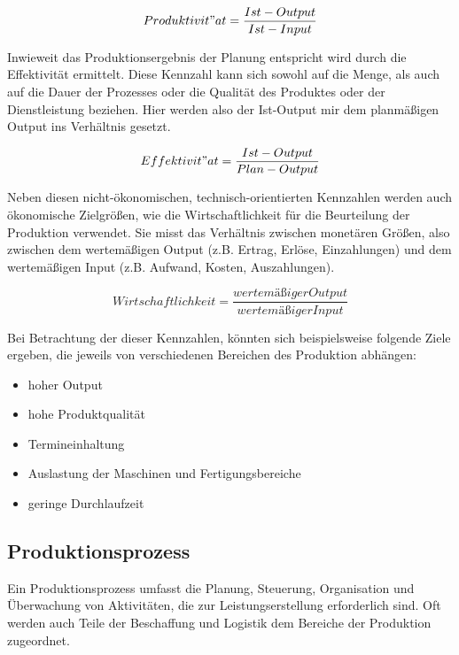 \documentclass[a4paper,12pt, german]{report}
\begin{document}
\begin{equation}
  Produktivit"at =\frac{Ist-Output}{Ist-Input}
\end{equation}

Inwieweit das Produktionsergebnis der Planung entspricht wird durch die Effektivität ermittelt. Diese Kennzahl kann sich sowohl auf die Menge, als auch auf die Dauer der Prozesses oder die Qualität des Produktes oder der Dienstleistung beziehen. Hier werden also der Ist-Output mir dem planmäßigen Output ins Verhältnis gesetzt.\cite{20}

\begin{equation}
  Effektivit"at =\frac{Ist-Output}{Plan-Output}
\end{equation}


Neben diesen nicht-ökonomischen, technisch-orientierten Kennzahlen werden auch ökonomische Zielgrößen, wie die Wirtschaftlichkeit für die Beurteilung der Produktion verwendet. Sie misst das Verhältnis zwischen monetären Größen, also zwischen dem wertemäßigen Output (z.B. Ertrag, Erlöse, Einzahlungen) und dem wertemäßigen Input (z.B. Aufwand, Kosten, Auszahlungen).\cite{7}

\begin{equation}
  Wirtschaftlichkeit =\frac{wertemäßiger Output}{wertemäßiger Input}
\end{equation}

Bei Betrachtung der dieser Kennzahlen, könnten sich beispielsweise folgende Ziele ergeben, die jeweils von verschiedenen Bereichen des Produktion abhängen: 

\begin{itemize}
  \item hoher Output
  \item hohe Produktqualität
  \item Termineinhaltung
  \item Auslastung der Maschinen und Fertigungsbereiche
  \item geringe Durchlaufzeit 
\end{itemize}

\subsection{Produktionsprozess}

Ein Produktionsprozess umfasst die Planung, Steuerung, Organisation und Überwachung von Aktivitäten, die zur Leistungserstellung erforderlich sind. 
Oft werden auch Teile der Beschaffung und Logistik dem Bereiche der Produktion zugeordnet. 
\end{document}
